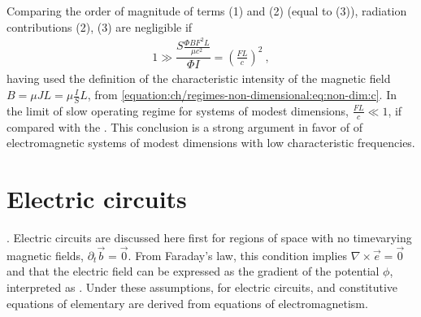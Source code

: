 \documentclass[letterpaper,10pt,english]{jupyterBook}
\begin{document}
\sphinxAtStartPar
Comparing the order of magnitude of terms (1) and (2) (equal to (3)), radiation contributions (2), (3) are negligible if
\begin{equation*}
\begin{split}1 \gg \dfrac{S \frac{\Phi B F^2 L}{\mu c^2}}{\Phi I} = \left(\frac{FL}{c}\right)^2 \ ,\end{split}
\end{equation*}
\sphinxAtStartPar
having used the definition of the characteristic intensity of the magnetic field \(B = \mu J L = \mu \frac{I}{S} L\), from \eqref{equation:ch/regimes-non-dimensional:eq:non-dim:c}. In the limit of slow operating regime for systems of modest dimensions, \(\frac{FL}{c} \ll 1\),  if compared with the . This conclusion is a strong argument in favor of  of electromagnetic systems of modest dimensions with low characteristic frequencies.





\sphinxstepscope




\chapter{Electric circuits}
\label{\detokenize{ch/circuits-electric:electric-circuits}}\label{\detokenize{ch/circuits-electric:classical-electromagnetism-circuits-electric}}\label{\detokenize{ch/circuits-electric::doc}}
\sphinxAtStartPar
{\hyperref[\detokenize{ch/circuits-electric-components:classical-electromagnetism-circuits-electric-approx}]{}}. Electric circuits are discussed here first for regions of space with no time\sphinxhyphen{}varying magnetic fields, \(\partial_t \vec{b} = \vec{0}\). From Faraday’s law, this condition implies \(\nabla \times \vec{e} = \vec{0}\) and that the electric field can be expressed as the gradient of the potential \(\phi\), interpreted as . Under these assumptions, {\hyperref[\detokenize{ch/circuits-electric-components:physics-hs-electromagnetism-circuits-electric-kirchhoff-laws}]{}} for electric circuits, and constitutive equations of elementary {\hyperref[\detokenize{ch/circuits-electric-components:classical-electromagnetism-circuits-electric-components}]{}} are derived from equations of electromagnetism.
\end{document}
